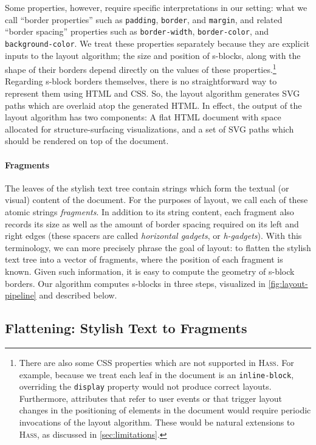 \documentclass[acmsmall, screen]{acmart}
\newcommand{\parahead}[1]
  {\paragraph{\textbf{#1}}}
\newcommand{\hass}
{\textsc{Hass}}
\begin{document}
Some properties, however, require specific interpretations in our setting:
what we call ``border properties'' such as \texttt{padding}, \texttt{border}, and \texttt{margin}, and related ``border spacing'' properties such as \texttt{border-width}, \texttt{border-color}, and \texttt{background-color}.
We treat these properties separately because they are explicit inputs to the layout algorithm;
the size and position of s-blocks, along with the shape of their borders depend directly on the values of these properties.\footnote{
There are also some CSS properties which are not supported in \hass{}.
For example, because we treat each leaf in the document is an \texttt{inline-block}, overriding the \texttt{display} property would not produce correct layouts.
Furthermore, attributes that refer to user events or that trigger layout changes in the positioning of elements in the document would require periodic invocations of the layout algorithm.
These would be natural extensions to \hass{}, as discussed in \autoref{sec:limitations}.
}
Regarding s-block borders themselves, there is no straightforward way to represent them using HTML and CSS.
So, the layout algorithm generates SVG paths which are overlaid atop the generated HTML.
In effect, the output of the layout algorithm has two components: A flat HTML document with space allocated for structure-surfacing visualizations, and a set of SVG paths which should be rendered on top of the document.











\parahead{Fragments}
The leaves of the stylish text tree contain strings which form the textual (or visual) content of the document.
For the purposes of layout, we call each of these atomic strings \textit{fragments}.
In addition to its string content, each fragment also records its size as well as the amount of border spacing required on its left and right edges (these spacers are called \textit{horizontal gadgets}, or \textit{h-gadgets}).
With this terminology, we can more precisely phrase the goal of layout: to flatten the stylish text tree into a vector of fragments, where the position of each fragment is known.
Given such information, it is easy to compute the geometry of s-block borders.
Our algorithm computes s-blocks in three steps, visualized in \autoref{fig:layout-pipeline} and described below.

\subsection{Flattening: Stylish Text to Fragments}
\end{document}
